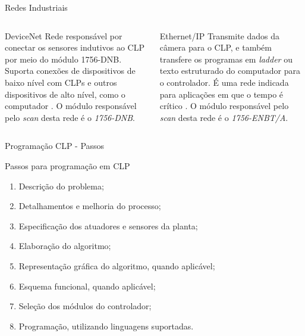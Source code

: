 \documentclass[10pt]{beamer}
\begin{document}
\begin{frame}[fragile]{Redes Industriais}
\begin{columns}[T]
\begin{column}{.5\textwidth}
\begin{block}{DeviceNet}
Rede responsável por conectar os sensores indutivos ao CLP por meio do módulo 1756-DNB. Suporta conexões de dispositivos de baixo nível com CLPs e outros dispositivos de alto nível, como o computador \cite{devicenetrockwell}. O módulo responsável pelo \textit{scan} desta rede é o \textit{1756-DNB}.
\end{block}
\end{column}

\begin{column}{.5\textwidth}
\begin{block}{Ethernet/IP}
Transmite dados da câmera para o CLP, e também transfere os programas em \textit{ladder} ou texto estruturado do computador para o controlador. É uma rede indicada para aplicações em que o tempo é crítico \cite{eiprockwell}. O módulo responsável pelo \textit{scan} desta rede é o \textit{1756-ENBT/A}.
\end{block}
\end{column}

\end{columns}
\end{frame}

\begin{frame}[fragile]{Programação CLP - Passos}
\begin{block}{Passos para programação em CLP}
\begin{enumerate}
  \item Descrição do problema;
  \item Detalhamentos e melhoria do processo;
  \item Especificação dos atuadores e sensores da planta;
  \item Elaboração do algoritmo;
  \item Representação gráfica do algoritmo, quando aplicável;
  \item Esquema funcional, quando aplicável;
  \item Seleção dos módulos do controlador;
  \item Programação, utilizando linguagens suportadas.
\end{enumerate}
\end{block}
\end{frame}
\end{document}
